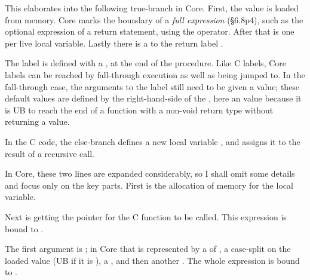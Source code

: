 
This elaborates into the following true-branch in Core. First, the value
 is loaded from memory. Core marks the boundary of a \emph{full
expression} (§6.8p4), such as the optional expression of a return statement,
using the  operator. After that is one %
 per live local variable. Lastly there is a %
 to the return label . %


The  label is defined with a , at the end
of the procedure. Like C labels, Core labels can be reached by fall-through
execution as well as being jumped to. In the fall-through case, the arguments
to the label still need to be given a value; these default values are defined
by the right-hand-side of the \coreinline{:=}, here an  %
value because it is UB to reach the end of a function with a non-void return
type without returning a value.


In the C code, the else-branch defines a new local variable ,
and assigns it to the result of a recursive call.


In Core, these two lines are expanded considerably, so I shall omit some
details and focus only on the key parts. First is the allocation of memory for
the local variable.


Next is getting the pointer for the C function to be called. This expression is
bound to .


The first argument is ; in Core that is represented by a
 of , a case-split on the loaded value %
(UB if it is ), a , %
and then another . The whole expression is bound %
to .


